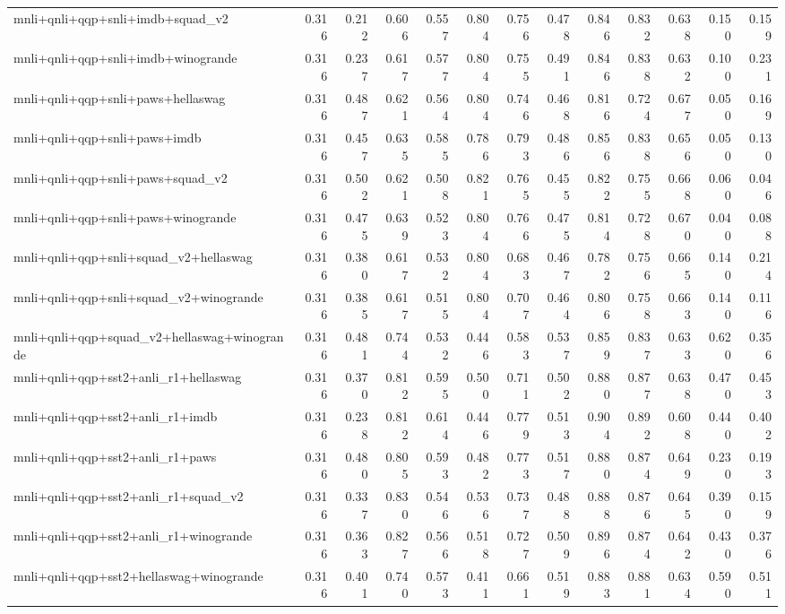 \begin{table}[t]
\begin{tabular}{lrrrrrrrrrrrr}
    mnli+qnli+qqp+snli+imdb+squad\_v2 & 0.316 & 0.212 & 0.606 & 0.557 & 0.804 & 0.756 & 0.478 & 0.846 & 0.832 & 0.638 & 0.150 & 0.159 \\
    mnli+qnli+qqp+snli+imdb+winogrande & 0.316 & 0.237 & 0.617 & 0.577 & 0.804 & 0.755 & 0.491 & 0.846 & 0.838 & 0.632 & 0.100 & 0.231 \\
    mnli+qnli+qqp+snli+paws+hellaswag & 0.316 & 0.487 & 0.621 & 0.564 & 0.804 & 0.746 & 0.468 & 0.816 & 0.724 & 0.677 & 0.050 & 0.169 \\
    mnli+qnli+qqp+snli+paws+imdb & 0.316 & 0.457 & 0.635 & 0.585 & 0.786 & 0.793 & 0.486 & 0.856 & 0.838 & 0.656 & 0.050 & 0.130 \\
    mnli+qnli+qqp+snli+paws+squad\_v2 & 0.316 & 0.502 & 0.621 & 0.508 & 0.821 & 0.765 & 0.455 & 0.822 & 0.755 & 0.668 & 0.060 & 0.046 \\
    mnli+qnli+qqp+snli+paws+winogrande & 0.316 & 0.475 & 0.639 & 0.523 & 0.804 & 0.766 & 0.475 & 0.814 & 0.728 & 0.670 & 0.040 & 0.088 \\
    mnli+qnli+qqp+snli+squad\_v2+hellaswag & 0.316 & 0.380 & 0.617 & 0.532 & 0.804 & 0.683 & 0.467 & 0.782 & 0.756 & 0.665 & 0.140 & 0.214 \\
    mnli+qnli+qqp+snli+squad\_v2+winogrande & 0.316 & 0.385 & 0.617 & 0.515 & 0.804 & 0.707 & 0.464 & 0.806 & 0.758 & 0.663 & 0.140 & 0.116 \\
    mnli+qnli+qqp+squad\_v2+hellaswag+winogrande & 0.316 & 0.481 & 0.744 & 0.532 & 0.446 & 0.583 & 0.537 & 0.859 & 0.837 & 0.633 & 0.620 & 0.356 \\
    mnli+qnli+qqp+sst2+anli\_r1+hellaswag & 0.316 & 0.370 & 0.812 & 0.595 & 0.500 & 0.711 & 0.502 & 0.880 & 0.877 & 0.638 & 0.470 & 0.453 \\
    mnli+qnli+qqp+sst2+anli\_r1+imdb & 0.316 & 0.238 & 0.812 & 0.614 & 0.446 & 0.779 & 0.513 & 0.904 & 0.892 & 0.608 & 0.440 & 0.402 \\
    mnli+qnli+qqp+sst2+anli\_r1+paws & 0.316 & 0.480 & 0.805 & 0.593 & 0.482 & 0.773 & 0.517 & 0.880 & 0.874 & 0.649 & 0.230 & 0.193 \\
    mnli+qnli+qqp+sst2+anli\_r1+squad\_v2 & 0.316 & 0.337 & 0.830 & 0.546 & 0.536 & 0.737 & 0.488 & 0.888 & 0.876 & 0.645 & 0.390 & 0.159 \\
    mnli+qnli+qqp+sst2+anli\_r1+winogrande & 0.316 & 0.363 & 0.827 & 0.566 & 0.518 & 0.727 & 0.509 & 0.896 & 0.874 & 0.642 & 0.430 & 0.376 \\
    mnli+qnli+qqp+sst2+hellaswag+winogrande & 0.316 & 0.401 & 0.740 & 0.573 & 0.411 & 0.661 & 0.519 & 0.883 & 0.881 & 0.634 & 0.590 & 0.511 \\

\end{tabular}
\end{table}
